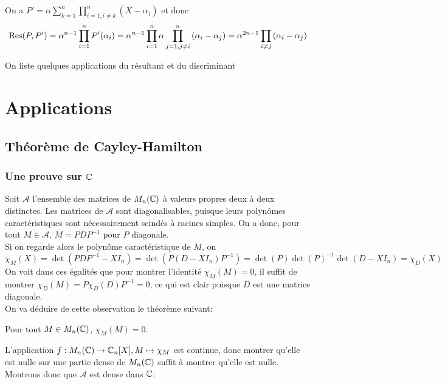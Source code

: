 \documentclass{article}
\begin{document}
\begin{preuve}
On a $P' = \alpha\sum_{k=1}^{n}\prod_{i=1, i \neq k}^{n}{(X-\alpha_j)}$ et donc 
$$\textrm{Res}(P, P')  = \alpha^{n-1}\prod_{i=1}^{n}{P'(\alpha_i)} = \alpha^{n-1} \prod_{i=1}^{n}{\alpha\prod_{j=1, j \neq i}^{n}{(\alpha_i-\alpha_j)}} = \alpha^{2n-1}\prod_{i \neq j}{(\alpha_i-\alpha_j)}$$
\end{preuve}

On liste quelques applications du résultant et du discriminant

\section{Applications}

\subsection{Théorème de Cayley-Hamilton}

\subsubsection{Une preuve sur $\mathbb{C}$}

Soit $\mathcal{A}$ l'ensemble des matrices de $M_n(\mathbb{C})$ à valeurs propres deux à deux distinctes. Les matrices de $\mathcal{A}$ sont diagonalisables, puisque leurs polynômes caractéristiques sont nécessairement scindés à racines simples. On a donc, pour tout $M \in \mathcal{A}$, $M = PDP^{-1}$ pour $P$ diagonale.\\
Si on regarde alors le polynôme caractéristique de $M$, on 
$$\chi_M(X) = \det(PDP^{-1} - XI_n) = \det(P(D - XI_n)P^{-1}) = \det(P)\det(P)^{-1}\det(D - XI_n) = \chi_D(X)$$
On voit dans ces égalités que pour montrer l'identité $\chi_M(M) = 0$, il suffit de montrer $\chi_D(M) = P\chi_D(D)P^{-1} = 0$, ce qui est clair puisque $D$ est une matrice diagonale.\\
On va déduire de cette observation le théorème suivant:

\begin{theoreme}
Pour tout $M \in M_n(\mathbb{C})$, $\chi_M(M) = 0$.
\end{theoreme}

L'application $f: M_n(\mathbb{C}) \to \mathbb{C}_n[X], M \mapsto \chi_M$ est continue, donc montrer qu'elle est nulle sur une partie dense de $M_n(\mathbb{C})$ suffit à montrer qu'elle est nulle. Montrons donc que $\mathcal{A}$ est dense dans $\mathbb{C}$:\\
\end{document}
